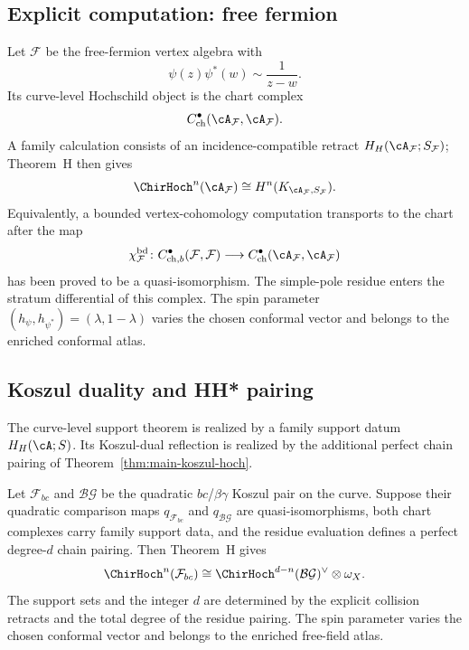 \subsection{Explicit computation: free fermion}

\begin{example}
\label{ex:HH-fermion-complete}
Let \(\mathcal F\) be the free-fermion vertex algebra with
\[
 \psi(z)\psi^*(w)\sim\frac{1}{z-w}.
\]
Its curve-level Hochschild object is the chart complex
\[
 C^\bullet_{\mathrm{ch}}(\cA_{\mathcal F},\cA_{\mathcal F}).
\]
A family calculation consists of an incidence-compatible retract
\(H_H(\cA_{\mathcal F};S_{\mathcal F})\); Theorem~H then gives
\[
 \ChirHoch^n(\cA_{\mathcal F})
 \cong H^n(K_{\cA_{\mathcal F},S_{\mathcal F}}).
\]
Equivalently, a bounded vertex-cohomology computation transports to
the chart after the map
\[
 \chi_{\mathcal F}^{\mathrm{bd}}\colon
 C^\bullet_{\mathrm{ch},b}(\mathcal F,\mathcal F)
 \longrightarrow
 C^\bullet_{\mathrm{ch}}(\cA_{\mathcal F},\cA_{\mathcal F})
\]
has been proved to be a quasi-isomorphism.  The simple-pole residue
enters the stratum differential of this complex.  The spin parameter
\((h_\psi,h_{\psi^*})=(\lambda,1-\lambda)\) varies the chosen conformal
vector and belongs to the enriched conformal atlas.
\end{example}

\subsection{Koszul duality and HH* pairing}

The curve-level support theorem is realized by a family support datum
$H_H(\cA;S)$.  Its Koszul-dual reflection is realized by the additional
perfect chain pairing of Theorem~\ref{thm:main-koszul-hoch}.

\begin{example}
\label{ver:boson-fermion-HH}
Let \(\mathcal F_{bc}\) and \(\mathcal{BG}\) be the quadratic
\(bc\)/\(\beta\gamma\) Koszul pair on the curve.  Suppose their
quadratic comparison maps \(q_{\mathcal F_{bc}}\) and
\(q_{\mathcal{BG}}\) are quasi-isomorphisms, both chart complexes carry
family support data, and the residue evaluation defines a perfect
degree-\(d\) chain pairing.  Then Theorem~H gives
\[
 \ChirHoch^n(\mathcal F_{bc})
 \cong
 \ChirHoch^{d-n}(\mathcal{BG})^\vee\otimes\omega_X.
\]
The support sets and the integer \(d\) are determined by the explicit
collision retracts and the total degree of the residue pairing.  The
spin parameter varies the chosen conformal vector and belongs to the
enriched free-field atlas.
\end{example}

